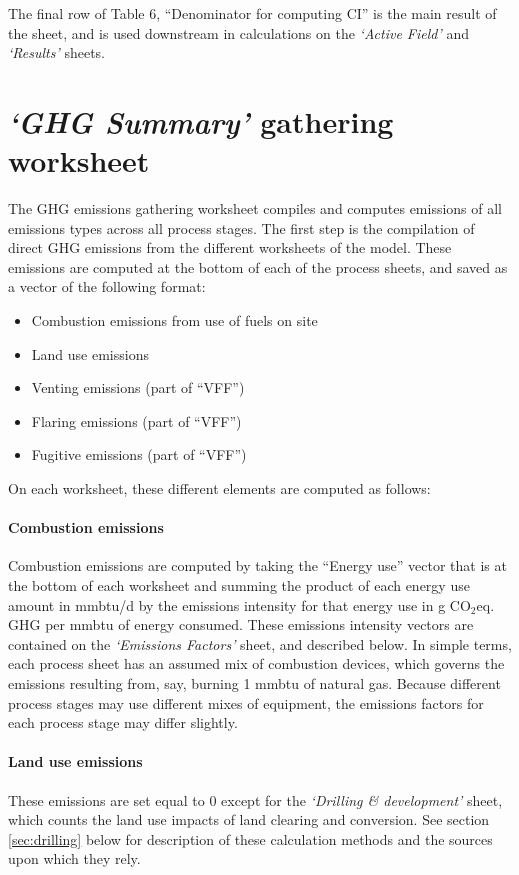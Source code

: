 \documentclass[11pt]{report}
\newcommand{\sheet}[1]{\textit{`{#1}'}}
\begin{document}
The final row of Table 6, ``Denominator for computing CI'' is the main result of the sheet, and is used downstream in calculations on the \sheet{Active Field} and \sheet{Results} sheets.




\clearpage

\section{\sheet{GHG Summary} gathering worksheet}\label{sec:GHG_emissions}

The GHG emissions gathering worksheet compiles and computes emissions of all emissions types across all process stages. The first step is the compilation of direct GHG emissions from the different worksheets of the model. These emissions are computed at the bottom of each of the process sheets, and saved as a vector of the following format:
\begin{itemize}
\item Combustion emissions from use of fuels on site
\item Land use emissions 
\item Venting emissions (part of ``VFF'')
\item Flaring emissions (part of ``VFF'')
\item Fugitive emissions (part of ``VFF'')
\end{itemize}

On each worksheet, these different elements are computed as follows:
\paragraph{Combustion emissions}
Combustion emissions are computed by taking the ``Energy use'' vector that is at the bottom of each worksheet and summing the product of each energy use amount in mmbtu/d by the emissions intensity for that energy use in g CO$_2$eq. GHG per mmbtu of energy consumed. These emissions intensity vectors are contained on the \sheet{Emissions Factors} sheet, and described below. In simple terms, each process sheet has an assumed mix of combustion devices, which governs the emissions resulting from, say, burning 1 mmbtu of natural gas. Because different process stages may use different mixes of equipment, the emissions factors for each process stage may differ slightly.

\paragraph{Land use emissions}
These emissions are set equal to 0 except for the \sheet{Drilling \& development} sheet, which counts the land use impacts of land clearing and conversion. See section \ref{sec:drilling} below for description of these calculation methods and the sources upon which they rely.
\end{document}
